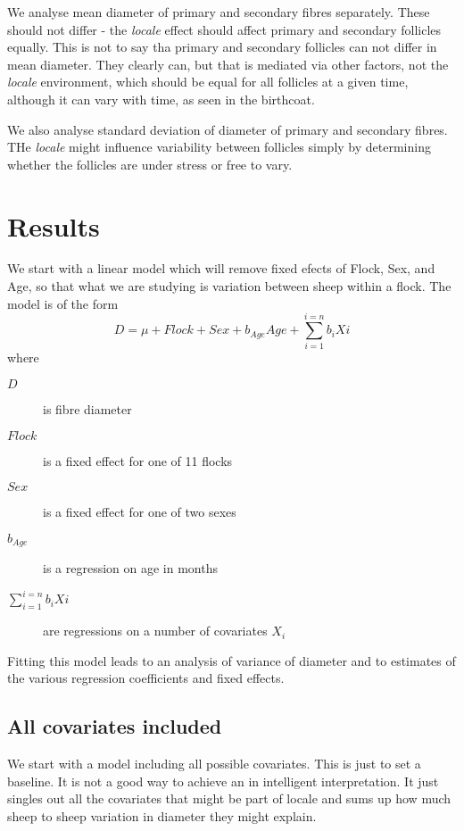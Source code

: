\documentclass[titlepage]{article}  %
\begin{document}
We analyse mean diameter of primary and secondary fibres separately. These should not differ - the {\em locale} effect should affect primary and secondary follicles equally. This is not to say tha primary and secondary follicles can not differ in mean diameter.  They clearly can,  but that is mediated via other factors, not the {\em locale} environment, which should be equal for all follicles at a given time, although it can vary with time, as seen in the birthcoat. 

We also analyse standard deviation of diameter of primary and secondary fibres. THe {\em locale} might influence variability between follicles simply by determining whether the follicles are under stress or free to vary.


\section{Results}
We start with a linear model which will remove fixed efects of Flock, Sex, and Age, so that what we are studying is variation between sheep within a flock. The model is of the form
\begin{equation}
\label{eqn:fullmod}
D = \mu + Flock + Sex + b_{Age} Age + \sum_{i=1}^{i=n} b_{i}X{i}
\end{equation}
where
\begin{description}
\item[$D$] is fibre diameter
\item[$Flock$] is a fixed effect for one of 11 flocks
\item[$Sex$] is a fixed effect for one of two sexes
\item[$b_{Age}$] is a regression on age in months 
\item[$\sum_{i=1}^{i=n} b_{i}X{i}$] are regressions on a number of covariates $X_{i}$
\end{description}

Fitting this model leads to an analysis of variance of diameter and to estimates of the various regression coefficients and fixed effects.

\subsection{All covariates included}
We start with a model including all possible covariates.  This is just to set a baseline. It is not a good way to achieve an in intelligent interpretation. It just singles out all the covariates that might be part of locale and sums up how much sheep to sheep variation in diameter they might explain.
\end{document}
